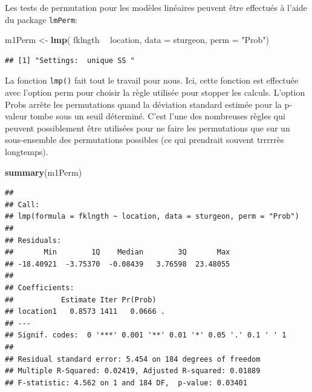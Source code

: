 \documentclass[12pt,]{book}
\newenvironment{Shaded}{\begin{snugshade}}{\end{snugshade}}
\newcommand{\DataTypeTok}[1]{\textcolor[rgb]{0.27,0.27,0.27}{#1}}
\newcommand{\KeywordTok}[1]{\textcolor[rgb]{0.27,0.27,0.27}{\textbf{#1}}}
\newcommand{\NormalTok}[1]{#1}
\newcommand{\OperatorTok}[1]{\textcolor[rgb]{0.43,0.43,0.43}{\textbf{#1}}}
\newcommand{\StringTok}[1]{\textcolor[rgb]{0.5,0.5,0.5}{#1}}
\begin{document}
Les tests de permutation pour les modèles linéaires peuvent être effectués à l'aide du package \texttt{lmPerm}:

\begin{Shaded}
\begin{Highlighting}[]
\NormalTok{m1Perm <-}\StringTok{ }\KeywordTok{lmp}\NormalTok{(}
\NormalTok{  fklngth }\OperatorTok{~}\StringTok{ }\NormalTok{location, }\DataTypeTok{data =}\NormalTok{ sturgeon,}
  \DataTypeTok{perm =} \StringTok{"Prob"}\NormalTok{)}
\end{Highlighting}
\end{Shaded}

\begin{verbatim}
## [1] "Settings:  unique SS "
\end{verbatim}

La fonction \texttt{lmp()} fait tout le travail pour nous. Ici, cette fonction est effectuée avec l'option perm pour choisir la règle utilisée pour stopper les calculs. L'option Probs arrête les permutations quand la déviation standard estimée pour la p-valeur tombe sous un seuil déterminé. C'est l'une des nombreuses règles qui peuvent possiblement être utilisées pour ne faire les permutations que sur un sous-ensemble des permutations possibles (ce qui prendrait souvent trrrrrès longtemps).

\begin{Shaded}
\begin{Highlighting}[]
\KeywordTok{summary}\NormalTok{(m1Perm)}
\end{Highlighting}
\end{Shaded}

\begin{verbatim}
## 
## Call:
## lmp(formula = fklngth ~ location, data = sturgeon, perm = "Prob")
## 
## Residuals:
##       Min        1Q    Median        3Q       Max 
## -18.40921  -3.75370  -0.08439   3.76598  23.48055 
## 
## Coefficients:
##           Estimate Iter Pr(Prob)  
## location1   0.8573 1411   0.0666 .
## ---
## Signif. codes:  0 '***' 0.001 '**' 0.01 '*' 0.05 '.' 0.1 ' ' 1
## 
## Residual standard error: 5.454 on 184 degrees of freedom
## Multiple R-Squared: 0.02419,	Adjusted R-squared: 0.01889 
## F-statistic: 4.562 on 1 and 184 DF,  p-value: 0.03401
\end{verbatim}
\end{document}
